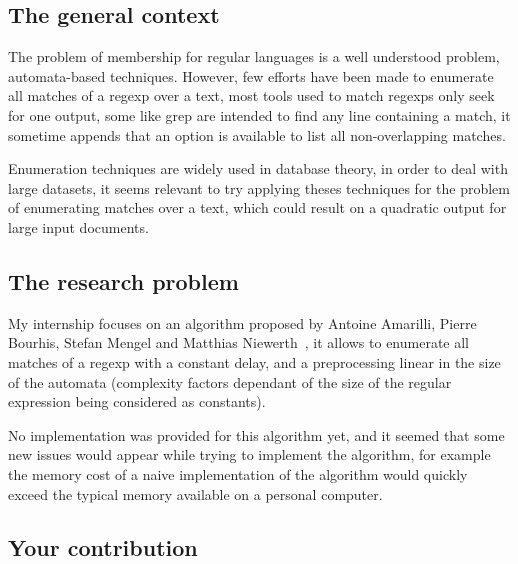 \subsection*{The general context}


  The problem of membership for regular languages is a well understood problem,
  automata-based techniques. However, few efforts have been made to enumerate
  all matches of a regexp over a text, most tools used to match regexps only
  seek for one output, some like grep are intended to find any line containing
  a match, it sometime appends that an option is available to list all
  non-overlapping matches.

  Enumeration techniques are widely used in database theory, in order to deal
  with large datasets, it seems relevant to try applying theses techniques for
  the problem of enumerating matches over a text, which could result on a
  quadratic output for large input documents.

\subsection*{The research problem}


  My internship focuses on an algorithm proposed by Antoine Amarilli, Pierre
  Bourhis, Stefan Mengel and Matthias Niewerth~\cite{ICDT19}, it allows to
  enumerate all matches of a regexp with a constant delay, and a preprocessing
  linear in the size of the automata (complexity factors dependant of the
  size of the regular expression being considered as constants).

  No implementation was provided for this algorithm yet, and it seemed that
  some new issues would appear while trying to implement the algorithm, for
  example the memory cost of a naive implementation of the algorithm would
  quickly exceed the typical memory available on a personal computer.

\subsection*{Your contribution}

